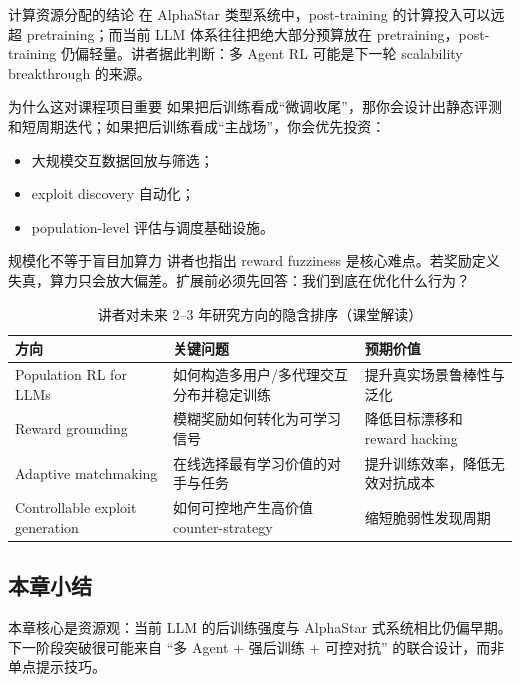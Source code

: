 \documentclass[a4paper]{article}
\begin{document}
\begin{importantbox}{计算资源分配的结论}
在 AlphaStar 类型系统中，post-training 的计算投入可以远超 pretraining；而当前 LLM 体系往往把绝大部分预算放在 pretraining，post-training 仍偏轻量。讲者据此判断：多 Agent RL 可能是下一轮 scalability breakthrough 的来源。
\end{importantbox}

\begin{knowledgebox}{为什么这对课程项目重要}
如果把后训练看成``微调收尾''，那你会设计出静态评测和短周期迭代；如果把后训练看成``主战场''，你会优先投资：
\begin{itemize}
    \item 大规模交互数据回放与筛选；
    \item exploit discovery 自动化；
    \item population-level 评估与调度基础设施。
\end{itemize}
\end{knowledgebox}

\begin{warningbox}{规模化不等于盲目加算力}
讲者也指出 reward fuzziness 是核心难点。若奖励定义失真，算力只会放大偏差。扩展前必须先回答：我们到底在优化什么行为？
\end{warningbox}

\begin{table}[H]
\centering
\caption{讲者对未来 2--3 年研究方向的隐含排序（课堂解读）}
\begin{tabular}{p{3.0cm}p{4.8cm}p{4.8cm}}
\toprule
方向 & 关键问题 & 预期价值 \\
\midrule
Population RL for LLMs & 如何构造多用户/多代理交互分布并稳定训练 & 提升真实场景鲁棒性与泛化 \\
Reward grounding & 模糊奖励如何转化为可学习信号 & 降低目标漂移和 reward hacking \\
Adaptive matchmaking & 在线选择最有学习价值的对手与任务 & 提升训练效率，降低无效对抗成本 \\
Controllable exploit generation & 如何可控地产生高价值 counter-strategy & 缩短脆弱性发现周期 \\
\bottomrule
\end{tabular}
\end{table}

\subsection{本章小结}
本章核心是资源观：当前 LLM 的后训练强度与 AlphaStar 式系统相比仍偏早期。下一阶段突破很可能来自 ``多 Agent + 强后训练 + 可控对抗'' 的联合设计，而非单点提示技巧。
\end{document}
